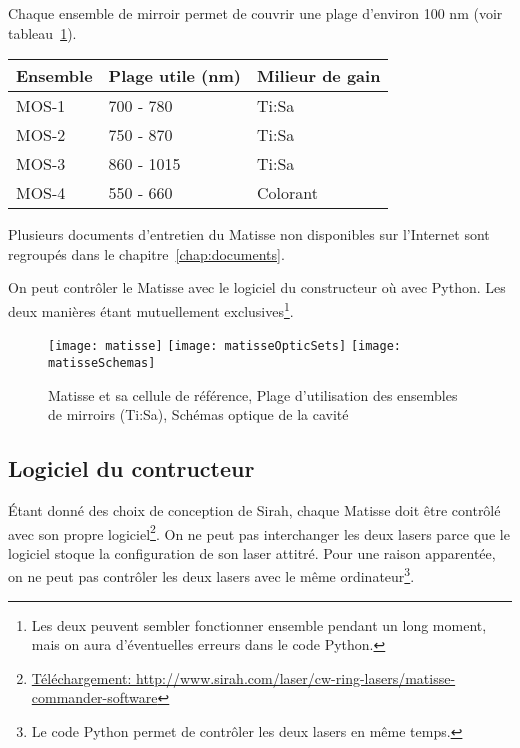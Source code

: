 \documentclass[11pt,francais]{book} %
\begin{document}
Chaque ensemble de mirroir permet de couvrir une plage d'environ 100 nm (voir tableau~\ref{tab:setMiroirsMatisse}).

\begin{table}[htbp]
  \centering
  \begin{tabular}{lll}
    Ensemble & Plage utile (nm) & Milieur de gain\\
    \hline
    MOS-1    & 700 - 780        & Ti:Sa\\
    MOS-2    & 750 - 870        & Ti:Sa\\
    MOS-3    & 860 - 1015       & Ti:Sa\\
    MOS-4    & 550 - 660        & Colorant\\
  \end{tabular}
  \label{tab:setMiroirsMatisse}
\end{table}



Plusieurs documents d'entretien du Matisse non disponibles sur l'Internet sont regroupés dans le chapitre~\ref{chap:documents}.

On peut contrôler le Matisse avec le logiciel du constructeur où avec Python.
Les deux manières étant mutuellement exclusives\footnote{Les deux peuvent sembler fonctionner ensemble pendant un long moment, mais on aura d'éventuelles erreurs dans le code Python.}.

\begin{figure}[htbp]
  \centering\texttt{[image: matisse]}
  \centering\texttt{[image: matisseOpticSets]}
  \centering\texttt{[image: matisseSchemas]}
  \caption{Matisse et sa cellule de référence, Plage d'utilisation des ensembles de mirroirs (Ti:Sa), Schémas optique de la cavité}
  \label{fig:matisse}
\end{figure}


\subsection{Logiciel du contructeur}

Étant donné des choix de conception de Sirah, chaque Matisse doit être contrôlé avec son propre logiciel\footnote{\url{Téléchargement: http://www.sirah.com/laser/cw-ring-lasers/matisse-commander-software}}.
On ne peut pas interchanger les deux lasers parce que le logiciel stoque la configuration de son laser attitré.
Pour une raison apparentée, on ne peut pas contrôler les deux lasers avec le même ordinateur\footnote{Le code Python permet de contrôler les deux lasers en même temps.}.
\end{document}
